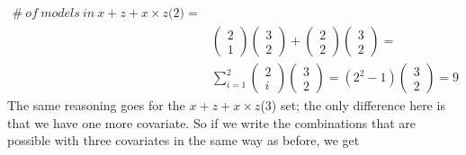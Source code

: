 \begin{equation*}
\begin{aligned}
\#\ of\ models\ in\ x + z +x \times z\textit{(2)}=\\
& \left( \begin{array}{c}
2 \\ 
1 \end{array}
\right)\left( \begin{array}{c}
3 \\ 
2 \end{array}
\right)+\left( \begin{array}{c}
2 \\ 
2 \end{array}
\right)\left( \begin{array}{c}
3 \\ 
2 \end{array}
\right)=\\
&\sum^2_{i=1}{\left( \begin{array}{c}
2 \\ 
i \end{array}
\right)}\left( \begin{array}{c}
3 \\ 
2 \end{array}
\right)=\left(2^2-1\right)\left( \begin{array}{c}
3 \\ 
2 \end{array}
\right)=9

\end{aligned}
\end{equation*}
\raggedbottom
The same reasoning goes for the $x + z + x \times z$(3) set; the only difference here is that we have one more covariate. So if we write the combinations that are possible with three covariates in the same way as before, we get
